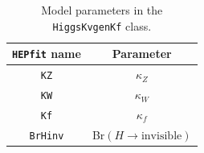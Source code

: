 \documentclass[preprint,3p,12pt]{elsarticle}
\newcommand{\HEPfit}{\texttt{HEPfit}\xspace}
\begin{document}
\begin{appendices}
\begin{table}[tb]
 \centering
 \caption{Model parameters in the {\tt HiggsKvgenKf} class.}\vspace{0.2cm}
  \begin{tabular}{| c | c | }
\hline
%
\textbf{\HEPfit name}&
\textbf{Parameter}\\
%
\hline
 {\tt KZ}&
$\kappa_Z$\\
%
 {\tt KW}&
$\kappa_W$\\
%
 {\tt Kf}&
$\kappa_f$\\
%
 {\tt BrHinv}&
Br$(H\to \mathrm{invisible})$\\
\hline
  \end{tabular}
 \label{tab:HiggsKvgenKfpars}
\end{table} 
\end{appendices}



\end{document}
